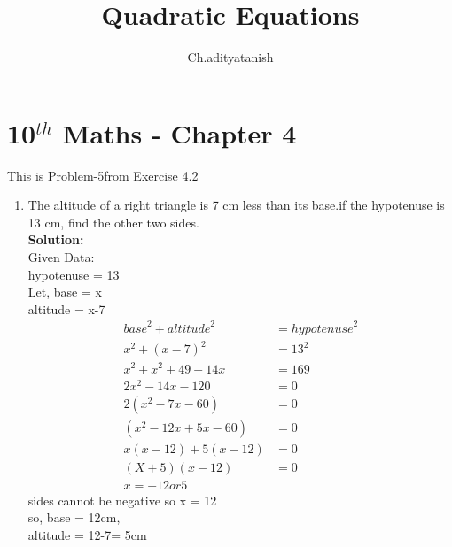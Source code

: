 \documentclass[12pt]{article}
\newcommand{\solution}{\noindent \textbf{Solution: }}
\begin{document}
\title{Quadratic Equations}
\author{Ch.adityatanish} %
\maketitle
\section*{10$^{th}$ Maths - Chapter 4}
This is Problem-5from Exercise 4.2
\begin{enumerate}
\item The altitude of a right triangle is 7 cm less than its base.if the hypotenuse is 13 cm, find the other two sides.\\
\solution \\
Given Data:\\
hypotenuse = 13\\
Let,
base = x\\
altitude = x-7\\
\begin{align}
{base}^2 + {altitude}^2 &= {hypotenuse}^2\\
{x}^2 + {(x-7)}^2 &= {13}^2\\
{x}^2 + {x}^2 + {49}-{14x} &= {169}\\
2{x}^2- 14x- 120 &= 0\\
2({x}^2 - 7x - 60) &= 0\\
(x^2 - 12x + 5x - 60)&= 0\\
x(x-12) + 5(x-12) &= 0\\
(X+5)(x-12) &= 0\\
x=-12 or 5
\end{align}
sides cannot be negative so x = 12\\
so, base = 12cm,\\
altitude = 12-7= 5cm\\

\end{enumerate}
\end{document}
